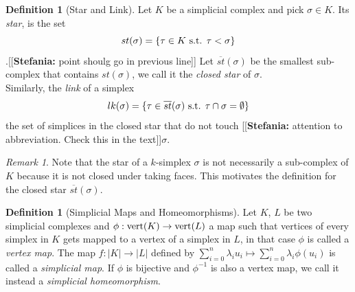 \documentclass{article}
\newcommand{\inv}{^{-1}}
\newcommand{\vertices}{\textmd{vert}}
\newcommand{\st}{\textmd{ s.t. }}
\newcommand{\ste}[1]{{\color{green}[[\textbf{Stefania: }#1]]}}
\theoremstyle{plain}
\theoremstyle{definition}
\newtheorem{definition}[thm]{Definition}
\theoremstyle{remark}
\newtheorem{remark}[thm]{Remark}
\begin{document}
	\begin{definition}[Star and Link]
		Let $K$ be a simplicial complex and pick $ \sigma \in K $. Its \emph{star}, is the set \[ st (\sigma) = \{ \tau \in K \st \tau < \sigma \} \].\ste{point shoulg go in previous line}
		Let $\overline{st} (\sigma)$ be the smallest sub-complex that contains $st(\sigma)$, we call it the \emph{closed star} of $\sigma$. \\
		Similarly, the \emph{link} of a simplex \[ lk (\sigma) = \{ \tau \in \overline{st}(\sigma) \st \tau \cap \sigma = \emptyset \} \] the set of simplices in the closed star that do not touch \ste{attention to abbreviation. Check this in the text}$\sigma$.
	\end{definition}
	\begin{remark}
        Note that the star of a $k$-simplex $\sigma$ is not necessarily a sub-complex of $K$ because it is not closed under taking faces. This motivates the definition for the closed star $ \overline{st} (\sigma) $.
	\end{remark}
	\begin{definition}[Simplicial Maps and Homeomorphisms]
		Let $K$, $L$ be two simplicial complexes and $ \phi: \vertices ( K) \to \vertices (L) $ a map such that vertices of every simplex in $K$ gets mapped to a vertex of a simplex in $L$, in that case $\phi$ is called a \emph{vertex map}. The map $f: |K| \to |L|$ defined by $ \sum_{i=0}^n \lambda_i u_i \mapsto \sum_{i=0}^n \lambda_i \phi(u_i) $ is called a \emph{simplicial map}. If $ \phi $ is bijective and $ \phi\inv $ is also a vertex map, we call it instead a \emph{simplicial homeomorphism}.
	\end{definition}
\end{document}
